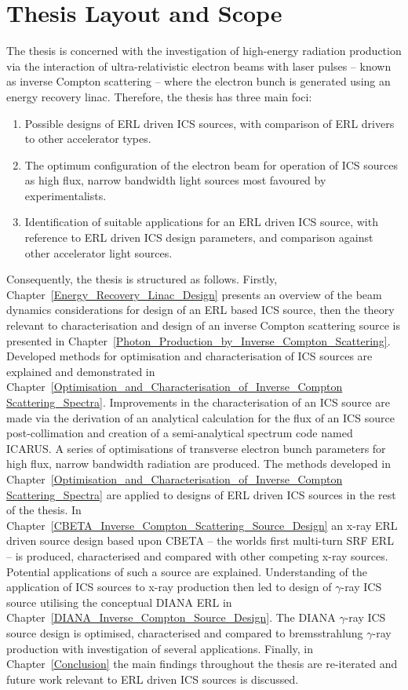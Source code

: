 \documentclass[../main.tex]{subfiles}
\begin{document}
\section{Thesis Layout and Scope}
\label{sec:thesis_layout_scope}

The thesis is concerned with the investigation of high-energy radiation production via the interaction of ultra-relativistic electron beams with laser pulses -- known as inverse Compton scattering -- where the electron bunch is generated using an energy recovery linac. Therefore, the thesis has three main foci: 
\begin{enumerate}
    \item{Possible designs of ERL driven ICS sources, with comparison of ERL drivers to other accelerator types.}
    \item{The optimum configuration of the electron beam for operation of ICS sources as high flux, narrow bandwidth light sources most favoured by experimentalists.}
    \item{Identification of suitable applications for an ERL driven ICS source, with reference to ERL driven ICS design parameters, and comparison against other accelerator light sources.}
\end{enumerate}

Consequently, the thesis is structured as follows. Firstly,  Chapter~\ref{Energy_Recovery_Linac_Design} presents an overview of the beam dynamics considerations for design of an ERL based ICS source, then the theory relevant to characterisation and design of an inverse Compton scattering source is presented in Chapter~\ref{Photon_Production_by_Inverse_Compton_Scattering}. Developed methods for optimisation and characterisation of ICS sources are explained and demonstrated in Chapter~\ref{Optimisation_and_Characterisation_of_Inverse_Compton Scattering_Spectra}. Improvements in the characterisation of an ICS source are made via the derivation of an analytical calculation for the flux of an ICS source post-collimation and creation of a semi-analytical spectrum code named \textsc{ICARUS}. A series of optimisations of transverse electron bunch parameters for high flux, narrow bandwidth radiation are produced. The methods developed in Chapter~\ref{Optimisation_and_Characterisation_of_Inverse_Compton Scattering_Spectra} are applied to designs of ERL driven ICS sources in the rest of the thesis. In Chapter~\ref{CBETA_Inverse_Compton_Scattering_Source_Design} an x-ray ERL driven source design based upon CBETA -- the worlds first multi-turn SRF ERL -- is produced, characterised and compared with other competing x-ray sources. Potential applications of such a source are explained. Understanding of the application of ICS sources to x-ray production then led to design of $\gamma$-ray ICS source utilising the conceptual DIANA ERL in Chapter~\ref{DIANA_Inverse_Compton_Source_Design}. The DIANA $\gamma$-ray ICS source design is optimised, characterised and compared to bremsstrahlung $\gamma$-ray production with investigation of several applications. Finally, in Chapter~\ref{Conclusion} the main findings throughout the thesis are re-iterated and future work relevant to ERL driven ICS sources is discussed.       
\end{document}
